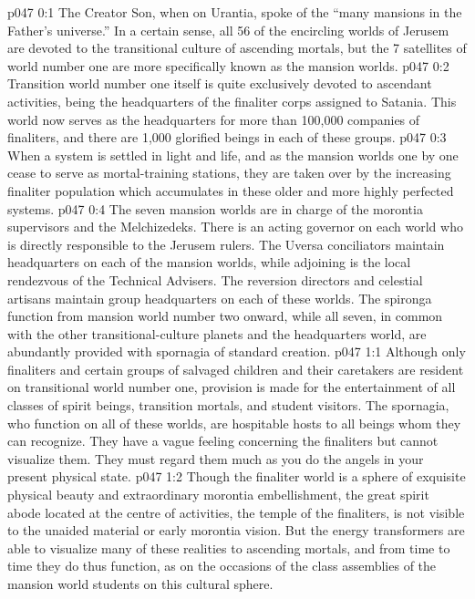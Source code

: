 \author{Brilliant Evening Star}
\vs p047 0:1 The Creator Son, when on Urantia, spoke of the “many mansions in the Father’s universe.” In a certain sense, all 56 of the encircling worlds of Jerusem are devoted to the transitional culture of ascending mortals, but the 7 satellites of world number one are more specifically known as the mansion worlds.
\vs p047 0:2 Transition world number one itself is quite exclusively devoted to ascendant activities, being the headquarters of the finaliter corps assigned to Satania. This world now serves as the headquarters for more than 100,000 companies of finaliters, and there are 1,000 glorified beings in each of these groups.
\vs p047 0:3 When a system is settled in light and life, and as the mansion worlds one by one cease to serve as mortal\hyp{}training stations, they are taken over by the increasing finaliter population which accumulates in these older and more highly perfected systems.
\vs p047 0:4 The seven mansion worlds are in charge of the morontia supervisors and the Melchizedeks. There is an acting governor on each world who is directly responsible to the Jerusem rulers. The Uversa conciliators maintain headquarters on each of the mansion worlds, while adjoining is the local rendezvous of the Technical Advisers. The reversion directors and celestial artisans maintain group headquarters on each of these worlds. The spironga function from mansion world number two onward, while all seven, in common with the other transitional\hyp{}culture planets and the headquarters world, are abundantly provided with spornagia of standard creation.
\vs p047 1:1 Although only finaliters and certain groups of salvaged children and their caretakers are resident on transitional world number one, provision is made for the entertainment of all classes of spirit beings, transition mortals, and student visitors. The spornagia, who function on all of these worlds, are hospitable hosts to all beings whom they can recognize. They have a vague feeling concerning the finaliters but cannot visualize them. They must regard them much as you do the angels in your present physical state.
\vs p047 1:2 Though the finaliter world is a sphere of exquisite physical beauty and extraordinary morontia embellishment, the great spirit abode located at the centre of activities, the temple of the finaliters, is not visible to the unaided material or early morontia vision. But the energy transformers are able to visualize many of these realities to ascending mortals, and from time to time they do thus function, as on the occasions of the class assemblies of the mansion world students on this cultural sphere.
